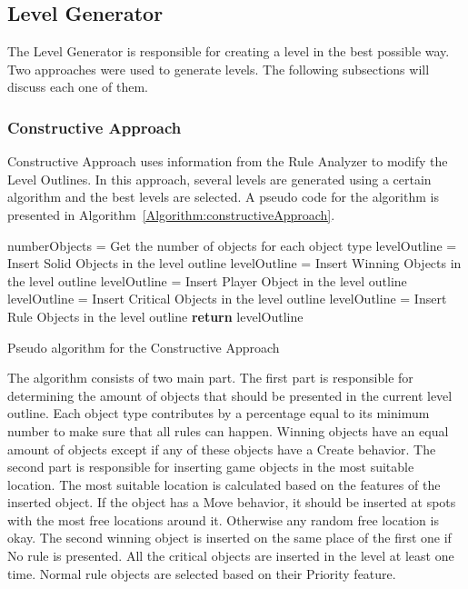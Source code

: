 \documentclass[letterpaper]{article}
\newcommand{\algref}[1]{Algorithm~\ref{Algorithm:#1}}
\begin{document}
\subsection{Level Generator}
The Level Generator is responsible for creating a level in the best possible way. Two approaches were used to generate levels. The following subsections will discuss each one of them.

\subsubsection{Constructive Approach}
Constructive Approach uses information from the Rule Analyzer to modify the Level Outlines. In this approach, several levels are generated using a certain algorithm and the best levels are selected. A pseudo code for the algorithm is presented in \algref{constructiveApproach}.\\\par

\setlength{\textfloatsep}{0pt}
\begin{algorithm}[ht]
	\BlankLine
	numberObjects = Get the number of objects for each object type\;
	\BlankLine
	levelOutline = Insert Solid Objects in the level outline\;
	levelOutline = Insert Winning Objects in the level outline\;
	levelOutline = Insert Player Object in the level outline\;
	levelOutline = Insert Critical Objects in the level outline\;
	levelOutline = Insert Rule Objects in the level outline\;
	\BlankLine
	\textbf{return} levelOutline\;
	\caption{Pseudo algorithm for the Constructive Approach}
	\label{Algorithm:constructiveApproach}
\end{algorithm}
\setlength{\textfloatsep}{10pt}

The algorithm consists of two main part. The first part is responsible for determining the amount of objects that should be presented in the current level outline. Each object type contributes by a percentage equal to its minimum number to make sure that all rules can happen. Winning objects have an equal amount of objects except if any of these objects have a Create behavior. The second part is responsible for inserting game objects in the most suitable location. The most suitable location is calculated based on the features of the inserted object. If the object has a Move behavior, it should be inserted at spots with the most free locations around it. Otherwise any random free location is okay. The second winning object is inserted on the same place of the first one if No rule is presented. All the critical objects are inserted in the level at least one time. Normal rule objects are selected based on their Priority feature.
\end{document}
